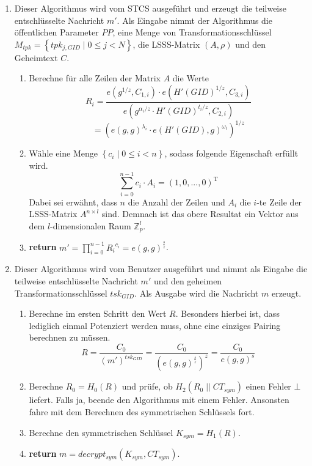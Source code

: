 \begin{enumerate}
	\item {} Dieser Algorithmus
		wird vom STCS ausgeführt und erzeugt die teilweise entschlüsselte Nachricht
		$m'$. Als Eingabe nimmt der Algorithmus die öffentlichen Parameter $PP$,
		eine Menge von Transformationsschlüssel $M_{tpk} = \left\{tpk_{j, GID}
		\;\vert\; 0 \leq j < N\right\}$, die LSSS-Matrix $\left(A, \rho\right)$ und
		den Geheimtext $C$.
		\begin{enumerate}
			\item Berechne für alle Zeilen der Matrix $A$ die Werte
				\begin{equation*}
					R_i = \frac{e(g^{1/z}, C_{1,i}) \cdot e(H'(GID)^{1/z},
					C_{3,i})}{e(g^{\alpha_i / z} \cdot H'(GID)^{t_i/z}, C_{2, i})}
				\end{equation*}
				\begin{equation*}
					= (e(g,g)^{\lambda_i} \cdot e(H'(GID), g)^{\omega_i})^{1/z}
				\end{equation*}
			\item Wähle eine Menge $\left\{c_i \;\vert\; 0 \leq i < n\right\}$, sodass
				folgende Eigenschaft erfüllt wird.
				\begin{equation*}
					\sum_{i=0}^{n-1} c_i \cdot A_i = \left(1, 0, ..., 0\right)^\mathrm{T}
				\end{equation*}
				Dabei sei erwähnt, dass $n$ die Anzahl der Zeilen und $A_i$ die $i$-te
				Zeile der LSSS-Matrix $A^{n \times l}$ sind. Demnach ist das obere
				Resultat ein Vektor aus dem $l$-dimensionalen Raum $\mathbb{Z}_p^l$.
			\item \textbf{return} $m' = \prod\limits_{i=0}^{n-1} {R_i}^{c_i} = e(g,
				g)^{\frac{s}{z}}$.
		\end{enumerate}

	\item {} Dieser Algorithmus wird vom
		Benutzer ausgeführt und nimmt als Eingabe die teilweise entschlüsselte
		Nachricht $m'$ und den geheimen Transformationsschlüssel $tsk_{GID}$. Als
		Ausgabe wird die Nachricht $m$ erzeugt.
		\begin{enumerate}
			\item Berechne im ersten Schritt den Wert $R$. Besonders hierbei ist, dass
				lediglich einmal Potenziert werden muss, ohne eine einziges
				Pairing berechnen zu müssen.
				\begin{equation*}
				R = \frac{C_0}{(m')^{tsk_{GID}}} = \frac{C_0}{\left(e(g,
				g)^{\frac{s}{z}}\right)^z} = \frac{C_0}{e(g, g)^s}
				\end{equation*}
			\item Berechne $R_0 = H_0(R)$ und prüfe, ob $H_2(R_0 \;||\; CT_{sym})$
				einen Fehler $\bot$ liefert. Falls ja, beende den Algorithmus mit einem
				Fehler. Ansonsten fahre mit dem Berechnen des symmetrischen Schlüssels
				fort.
			\item Berechne den symmetrischen Schlüssel $K_{sym} = H_1(R)$.
			\item \textbf{return} $m = decrypt_{sym}\left(K_{sym}, CT_{sym}\right)$.
		\end{enumerate}
\end{enumerate}

